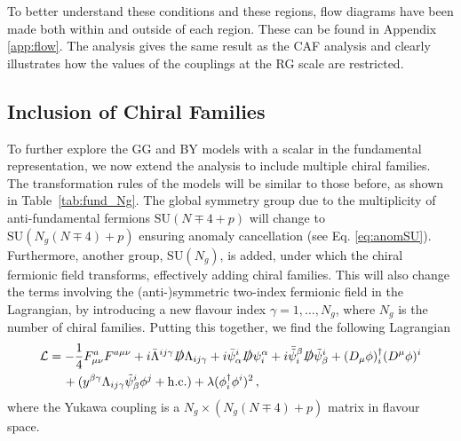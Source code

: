 To better understand these conditions and these regions, flow diagrams have been made both within and outside of each region. These can be found in Appendix \ref{app:flow}. The analysis gives the same result as the CAF analysis and clearly illustrates how the values of the couplings at the RG scale are restricted. 

\subsection{Inclusion of Chiral Families }\label{sec:fundscalarNg}
To further explore the GG  and BY models with a scalar in the fundamental representation, we now extend the analysis to include multiple chiral families. The transformation rules of the models will be similar to those before, as shown in Table~\ref{tab:fund_Ng}. The global symmetry group due to the multiplicity of anti-fundamental fermions $\mathrm{SU}(N\mp4+p)$ will change to $\mathrm{SU}(N_g(N\mp4)+p)$ ensuring anomaly cancellation (see Eq. \eqref{eq:anomSU}). Furthermore, another group, $\mathrm{SU}(N_g)$, is added, under which the chiral fermionic field transforms, effectively adding chiral families. This will also change the terms involving the (anti-)symmetric two-index fermionic field in the Lagrangian, by introducing a new flavour index $\gamma=1,\dots,N_g$, where $N_g$ is the number of chiral families. Putting this together, we find the following Lagrangian
\begin{align}
    \mathcal{L}&=  -\frac{1}{4} F_{\mu\nu}^a F^{a\mu\nu}+ i \bar \Lambda^{ij\gamma}\slashed{D}\Lambda_{ij\gamma}
    + i \bar{\psi}^i_\alpha \slashed{D} \psi_i^\alpha 
    + i \bar{\tilde{\psi}}_i^\beta \slashed{D} \tilde{\psi}^i_\beta +(D_\mu \phi)_i^\dagger (D^\mu\phi)^i\nonumber\\&\,\quad+(y^{\beta\gamma}\Lambda_{ij\gamma} \tilde\psi ^{i}_{\beta} \phi^j + \mathrm{h.c.})+\lambda (\phi^\dagger_i \phi^i)^2 
    \,,
\end{align}
where the Yukawa coupling is a $N_g\times (N_g(N\mp4)+p)$ matrix in flavour space.

